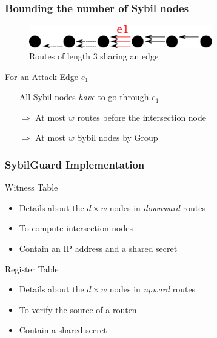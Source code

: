 \documentclass{beamer}
\begin{document}

\begin{frame}

  \frametitle{Bounding the number of Sybil nodes}

  \begin{figure}
    \includegraphics[width=8cm]{./pictures/bound_nodes} 
    \caption{Routes of length 3 sharing an edge}
  \end{figure}
  
  \begin{block}{For an Attack Edge $e_1$}
    \begin{itemize}
      \item[] All Sybil nodes \emph{have} to go through $e_1$
      \item[$\Rightarrow$] At most $w$ routes before the intersection node %
      \item[$\Rightarrow$] At most $w$ Sybil nodes by Group
    \end{itemize}
  \end{block}

\end{frame}


\begin{frame}

  \frametitle{SybilGuard Implementation}

  \begin{block}{Witness Table}
    \begin{itemize}
    \item Details about the $d \times w$ nodes in \emph{downward} routes
    \item To compute intersection nodes
    \item Contain an IP address and a shared secret
    \end{itemize}
  \end{block}

  \begin{block}{Register Table}
    \begin{itemize}
    \item Details about the $d \times w$ nodes in \emph{upward} routes
    \item To verify the source of a routen
    \item Contain a shared secret
    \end{itemize}
  \end{block}

\end{frame}
\end{document}
